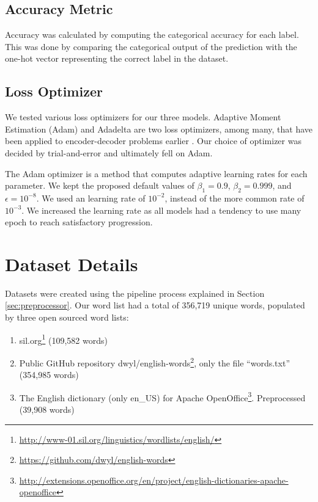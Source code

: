 \subsection{Accuracy Metric}
Accuracy was calculated by computing the categorical accuracy for each label. This was done by comparing the categorical output of the prediction with the one-hot vector representing the correct label in the dataset.

\subsection{Loss Optimizer}
We tested various loss optimizers for our three models. Adaptive Moment Estimation (Adam) \citep{kingma2014adam} and Adadelta \citep{zeiler2012adadelta} are two loss optimizers, among many, that have been applied to encoder-decoder problems earlier \citep{cho2014properties, arik2017deep}. Our choice of optimizer was decided by trial-and-error and ultimately fell on Adam.

The Adam optimizer is a method that computes adaptive learning rates for each parameter. We kept the proposed default values of \(\beta_{1} = 0.9\), \(\beta_{2} = 0.999\), and \(\epsilon = 10^{-8}\). We used an learning rate of \(10^{-2}\), instead of the more common rate of \(10^{-3}\). We increased the learning rate as all models had a tendency to use many epoch to reach satisfactory progression.

\section{Dataset Details}
\label{sec:dataset_details}
Datasets were created using the pipeline process explained in Section \ref{sec:preprocessor}. Our word list had a total of 356,719 unique words, populated by three open sourced word lists:

\begin{enumerate}
    \item sil.org\footnote{\url{http://www-01.sil.org/linguistics/wordlists/english/}} (109,582 words)
    \item Public GitHub repository dwyl/english-words\footnote{\url{https://github.com/dwyl/english-words}}, only the file ``words.txt'' (354,985 words) 
    \item The English dictionary (only en\_US) for Apache OpenOffice\footnote{\url{http://extensions.openoffice.org/en/project/english-dictionaries-apache-openoffice}}. Preprocessed (39,908 words)
\end{enumerate}

